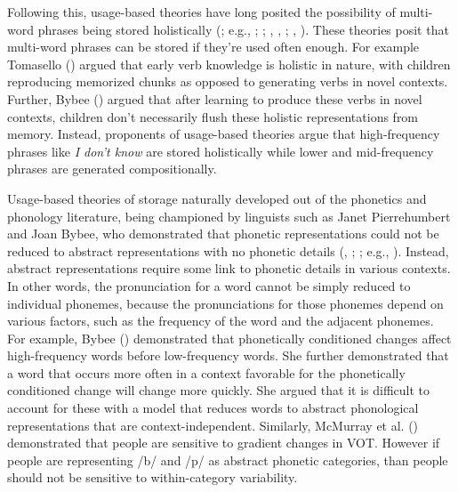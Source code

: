 \documentclass[
  12pt,
  letterpaper,
]{scrreprt}
\begin{document}
Following this, usage-based theories have long posited the possibility
of multi-word phrases being stored holistically
(; e.g.,
;
;
,
,
;
,
). These theories
posit that multi-word phrases can be stored if they're used often
enough. For example Tomasello
()
argued that early verb knowledge is holistic in nature, with children
reproducing memorized chunks as opposed to generating verbs in novel
contexts. Further, Bybee () argued that
after learning to produce these verbs in novel contexts, children don't
necessarily flush these holistic representations from memory. Instead,
proponents of usage-based theories argue that high-frequency phrases
like \emph{I don't know} are stored holistically while lower and
mid-frequency phrases are generated compositionally.

Usage-based theories of storage naturally developed out of the phonetics
and phonology literature, being championed by linguists such as Janet
Pierrehumbert and Joan Bybee, who demonstrated that phonetic
representations could not be reduced to abstract representations with no
phonetic details (, ;
;
e.g.,
). Instead, abstract representations require some link to phonetic
details in various contexts. In other words, the pronunciation for a
word cannot be simply reduced to individual phonemes, because the
pronunciations for those phonemes depend on various factors, such as the
frequency of the word and the adjacent phonemes. For example, Bybee
() demonstrated that
phonetically conditioned changes affect high-frequency words before
low-frequency words. She further demonstrated that a word that occurs
more often in a context favorable for the phonetically conditioned
change will change more quickly. She argued that it is difficult to
account for these with a model that reduces words to abstract
phonological representations that are context-independent. Similarly,
McMurray et al.
() demonstrated
that people are sensitive to gradient changes in VOT. However if people
are representing /b/ and /p/ as abstract phonetic categories, than
people should not be sensitive to within-category variability.
\end{document}
